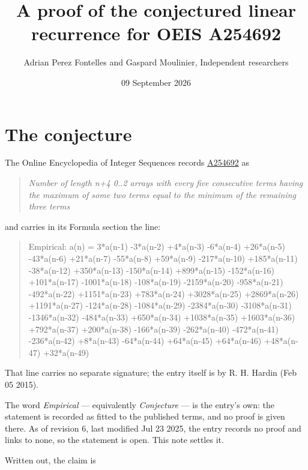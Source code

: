 \documentclass[11pt]{article}
\title{A proof of the conjectured linear recurrence for OEIS A254692}
\author{Adrian Perez Fontelles and Gaspard Moulinier, Independent researchers}
\date{09 September 2026}
\theoremstyle{definition}
\begin{document}
\maketitle
\section{The conjecture}

The Online Encyclopedia of Integer Sequences records \href{https://oeis.org/A254692}{A254692} as

\begin{quote}\itshape Number of length n+4 0..2 arrays with every five consecutive terms having the maximum of some two terms equal to the minimum of the remaining three terms\end{quote}

and carries in its Formula section the line:

\begin{quote}\ttfamily Empirical: a(n) = 3*a(n-1) -3*a(n-2) +4*a(n-3) -6*a(n-4) +26*a(n-5) -43*a(n-6) +21*a(n-7) -55*a(n-8) +59*a(n-9) -217*a(n-10) +185*a(n-11) -38*a(n-12) +350*a(n-13) -150*a(n-14) +899*a(n-15) -152*a(n-16) +101*a(n-17) -1001*a(n-18) -108*a(n-19) -2159*a(n-20) -958*a(n-21) -492*a(n-22) +1151*a(n-23) +783*a(n-24) +3028*a(n-25) +2869*a(n-26) +1191*a(n-27) -124*a(n-28) -1084*a(n-29) -2384*a(n-30) -3108*a(n-31) -1346*a(n-32) -484*a(n-33) +650*a(n-34) +1038*a(n-35) +1603*a(n-36) +792*a(n-37) +200*a(n-38) -166*a(n-39) -262*a(n-40) -472*a(n-41) -236*a(n-42) +8*a(n-43) -64*a(n-44) +64*a(n-45) +64*a(n-46) +48*a(n-47) +32*a(n-49)\end{quote}

That line carries no separate signature; the entry itself is by R. H. Hardin (Feb 05 2015).

The word {\itshape Empirical} --- equivalently {\itshape Conjecture} --- is the entry's own: the statement is recorded as fitted to the published terms, and no proof is given there. As of revision 6, last modified Jul 23 2025, the entry records no proof and links to none, so the statement is open. This note settles it.

Written out, the claim is
\end{document}
